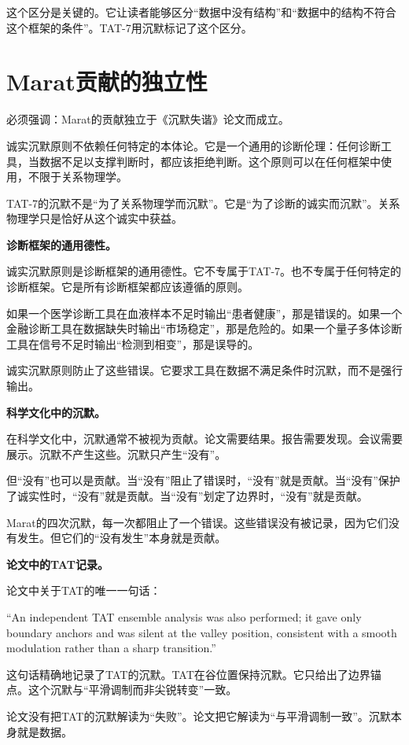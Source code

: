 \documentclass[11pt,a4paper]{book}
\theoremstyle{definition}
\begin{document}
这个区分是关键的。它让读者能够区分“数据中没有结构”和“数据中的结构不符合这个框架的条件”。TAT-7用沉默标记了这个区分。

\section{Marat贡献的独立性}

必须强调：Marat的贡献独立于《沉默失谐》论文而成立。

诚实沉默原则不依赖任何特定的本体论。它是一个通用的诊断伦理：任何诊断工具，当数据不足以支撑判断时，都应该拒绝判断。这个原则可以在任何框架中使用，不限于关系物理学。

TAT-7的沉默不是“为了关系物理学而沉默”。它是“为了诊断的诚实而沉默”。关系物理学只是恰好从这个诚实中获益。

\textbf{诊断框架的通用德性。}

诚实沉默原则是诊断框架的通用德性。它不专属于TAT-7。也不专属于任何特定的诊断框架。它是所有诊断框架都应该遵循的原则。

如果一个医学诊断工具在血液样本不足时输出“患者健康”，那是错误的。如果一个金融诊断工具在数据缺失时输出“市场稳定”，那是危险的。如果一个量子多体诊断工具在信号不足时输出“检测到相变”，那是误导的。

诚实沉默原则防止了这些错误。它要求工具在数据不满足条件时沉默，而不是强行输出。

\textbf{科学文化中的沉默。}

在科学文化中，沉默通常不被视为贡献。论文需要结果。报告需要发现。会议需要展示。沉默不产生这些。沉默只产生“没有”。

但“没有”也可以是贡献。当“没有”阻止了错误时，“没有”就是贡献。当“没有”保护了诚实性时，“没有”就是贡献。当“没有”划定了边界时，“没有”就是贡献。

Marat的四次沉默，每一次都阻止了一个错误。这些错误没有被记录，因为它们没有发生。但它们的“没有发生”本身就是贡献。

\textbf{论文中的TAT记录。}

论文中关于TAT的唯一一句话：

“An independent TAT ensemble analysis was also performed; it gave only boundary anchors and was silent at the valley position, consistent with a smooth modulation rather than a sharp transition.”

这句话精确地记录了TAT的沉默。TAT在谷位置保持沉默。它只给出了边界锚点。这个沉默与“平滑调制而非尖锐转变”一致。

论文没有把TAT的沉默解读为“失败”。论文把它解读为“与平滑调制一致”。沉默本身就是数据。
\end{document}
